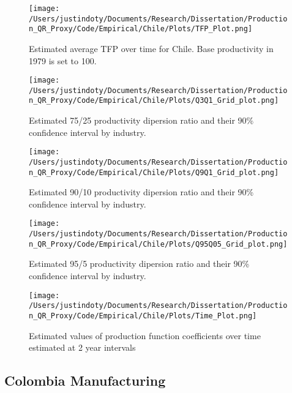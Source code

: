 \documentclass[11pt]{article}
\begin{document}
\begin{figure}[H]
\centering
\texttt{[image: /Users/justindoty/Documents/Research/Dissertation/Production\_QR\_Proxy/Code/Empirical/Chile/Plots/TFP\_Plot.png]}
\caption{Estimated average TFP over time for Chile. Base productivity in 1979 is set to 100.}
\end{figure}

\begin{figure}[H]
\centering
\texttt{[image: /Users/justindoty/Documents/Research/Dissertation/Production\_QR\_Proxy/Code/Empirical/Chile/Plots/Q3Q1\_Grid\_plot.png]}
\caption{Estimated 75/25 productivity dipersion ratio and their 90\% confidence interval by industry.}
\end{figure}

\begin{figure}[H]
\centering
\texttt{[image: /Users/justindoty/Documents/Research/Dissertation/Production\_QR\_Proxy/Code/Empirical/Chile/Plots/Q9Q1\_Grid\_plot.png]}
\caption{Estimated 90/10 productivity dipersion ratio and their 90\% confidence interval by industry.}
\end{figure}

\begin{figure}[H]
\centering
\texttt{[image: /Users/justindoty/Documents/Research/Dissertation/Production\_QR\_Proxy/Code/Empirical/Chile/Plots/Q95Q05\_Grid\_plot.png]}
\caption{Estimated 95/5 productivity dipersion ratio and their 90\% confidence interval by industry.}
\end{figure}

\begin{figure}[H]
\centering
\texttt{[image: /Users/justindoty/Documents/Research/Dissertation/Production\_QR\_Proxy/Code/Empirical/Chile/Plots/Time\_Plot.png]}
\caption{Estimated values of production function coefficients over time estimated at 2 year intervals}
\end{figure}



\subsection{Colombia Manufacturing}



\end{document}
